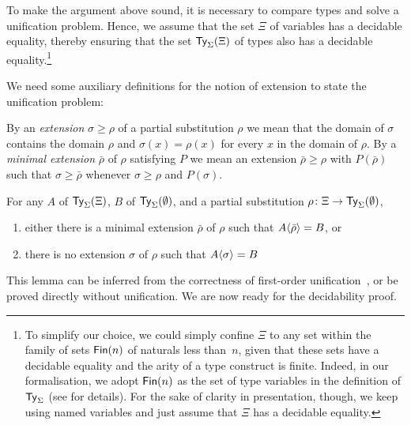 \begin{remark}
To make the argument above sound, it is necessary to compare types and solve a unification problem.
Hence, we assume that the set\/ $\Xi$ of variables has a decidable equality, thereby ensuring that the set $\mathsf{Ty}_{\Sigma}(\Xi)$ of types also has a decidable equality.\footnote{%
To simplify our choice, we could simply confine $\Xi$ to any set within the family of sets $\mathsf{Fin}(n)$ of naturals less than~$n$, given that these sets have a decidable equality and the arity of a type construct is finite.
Indeed, in our formalisation, we adopt $\mathsf{Fin}(n)$ as the set of type variables in the definition of $\mathsf{Ty}_{\Sigma}$ (see  for details).
For the sake of clarity in presentation, though, we keep using named variables and just assume that $\Xi$ has a decidable equality.}
\end{remark}
We need some auxiliary definitions for the notion of extension to state the unification problem:
\begin{definition}
  By an \emph{extension}\/ $\sigma \geq \rho$ of a partial substitution $\rho$ we mean that the domain of $\sigma$ contains the domain $\rho$ and\/ $\sigma(x) = \rho(x)$ for every\/ $x$ in the domain of $\rho$.
  By a \emph{minimal extension}\/ $\bar{\rho}$ of $\rho$ satisfying $P$ we mean an extension $\bar{\rho} \geq \rho$ with $P(\bar{\rho})$ such that $\sigma \geq \bar{\rho}$ whenever $\sigma \geq \rho$ and $P(\sigma)$.
\end{definition}
\begin{lemma}\label{lem:unify}
  For any\/ $A$ of\/ $\mathsf{Ty}_{\Sigma}(\Xi)$, $B$ of\/ $\mathsf{Ty}_{\Sigma}(\emptyset)$, and a partial substitution\/ $\rho \colon \Xi \to \mathsf{Ty}_{\Sigma}(\emptyset)$, 
  \begin{enumerate}
    \item either there is a minimal extension\/ $\bar{\rho}$ of\/ $\rho$ such that\/ ${A}\!\left<{\bar{\rho}}\right> = B$, or 
    \item there is no extension\/ $\sigma$ of\/ $\rho$ such that\/ ${A}\!\left<{\sigma}\right> = B$
  \end{enumerate}
\end{lemma}
This lemma can be inferred from the correctness of first-order unification~\citep{McBride2003,McBride2003a}, or be proved directly without unification.
We are now ready for the decidability proof.

